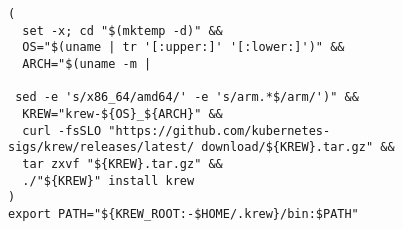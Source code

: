 \begin{verbatim}
(
  set -x; cd "$(mktemp -d)" &&
  OS="$(uname | tr '[:upper:]' '[:lower:]')" &&
  ARCH="$(uname -m |

 sed -e 's/x86_64/amd64/' -e 's/arm.*$/arm/')" &&
  KREW="krew-${OS}_${ARCH}" &&
  curl -fsSLO "https://github.com/kubernetes-sigs/krew/releases/latest/ download/${KREW}.tar.gz" &&
  tar zxvf "${KREW}.tar.gz" &&
  ./"${KREW}" install krew
)
export PATH="${KREW_ROOT:-$HOME/.krew}/bin:$PATH"
\end{verbatim}